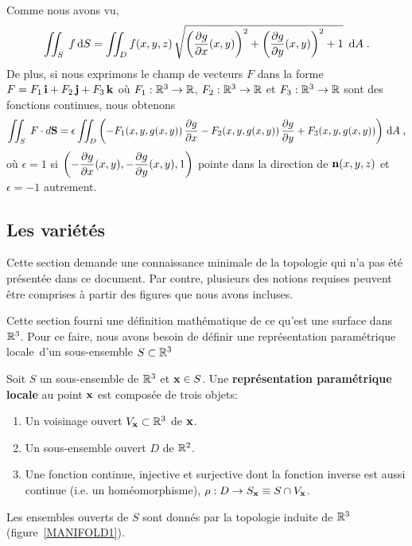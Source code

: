 {Comme nous avons vu,
\[
\iint_S\; f \,\mathrm{d}S =
\iint_D f(x,y,z)\,\sqrt{ \left(\frac{\partial g}{\partial x}(x,y)\right)^2 +
    \left(\frac{\partial g}{\partial y}(x,y)\right)^2 + 1}\ \,\mathrm{d}A \; .
\]
De plus, si nous exprimons le champ de vecteurs $F$ dans la forme
$F = F_1\,\mathbf{i} + F_2\,\mathbf{j} + F_3\,\mathbf{k}$ où $F_1:\mathbb{R}^3\rightarrow \mathbb{R}$,
$F_2:\mathbb{R}^3\rightarrow \mathbb{R}$ et $F_3:\mathbb{R}^3\rightarrow \mathbb{R}$ sont des fonctions
continues, nous obtenons
\[
\iint_S\; F\cdot d\mathbf{S} = \epsilon \iint_D
\left(-F_1(x,y,g(x,y)) \, \frac{\partial g}{\partial x} -F_2(x,y,g(x,y))\,\frac{\partial g}{\partial y}
  + F_3(x,y,g(x,y))\right)\,\mathrm{d}A \; ,
\]
où $\epsilon = 1$ si
$\displaystyle \left(-\frac{\partial g}{\partial x}(x,y),
-\frac{\partial g}{\partial y}(x,y), 1\right)$ pointe dans la direction de
$\mathbf{n}(x,y,z)$ et $\epsilon = -1$ autrement.

\subsection{Les variétés \theory} \label{variety}

Cette section demande une connaissance minimale de la topologie qui
n'a pas été présentée dans ce document.  Par contre, plusieurs des
notions requises peuvent être comprises à partir des figures que nous
avons incluses.

Cette section fourni une définition mathématique de ce qu'est une
surface dans $\mathbb{R}^3$.  Pour ce faire, nous avons besoin de définir
une \lgm représentation paramétrique locale\rgm\ d'un sous-ensemble
$S \subset \mathbb{R}^3$ 

Soit $S$ un sous-ensemble de $\mathbb{R}^3$ et $\mathbf{x} \in S$.  Une
{\bfseries représentation paramétrique locale} au point $\mathbf{x}$ est
composée de trois objets:
\begin{enumerate}
\item Un voisinage ouvert $V_{\mathbf{x}} \subset \mathbb{R}^3$ de $\mathbf{x}$.
\item Un sous-ensemble ouvert $D$ de $\mathbb{R}^2$.
\item Une fonction continue, injective et surjective dont la fonction
inverse est aussi continue (i.e. un homéomorphisme),
$\rho:D\rightarrow S_{\mathbf{x}} \equiv S \cap V_{\mathbf{x}}$.
\end{enumerate}
Les ensembles ouverts de $S$ sont donnés par la topologie induite de $\mathbb{R}^3$
(figure~\ref{MANIFOLD1}).


}
